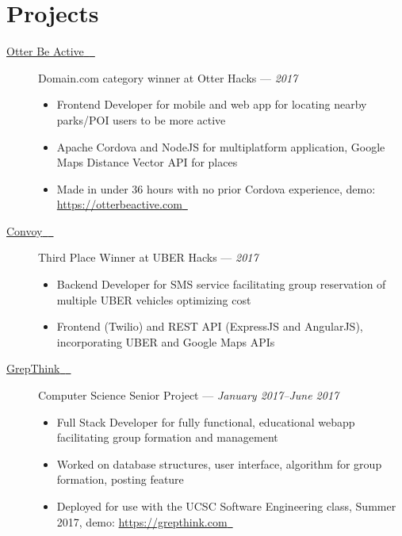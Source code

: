 \documentclass[10pt]{article}
\let\orighref\href
\renewcommand{\href}[2]{\orighref{#1}{#2{\scriptsize~\color{darkgray}\faExternalLink}}}
\renewcommand{\url}[1]{\href{#1}{#1}}
\begin{document}
\section*{Projects}
\begin{description}
  \item[\href{https://github.com/4U6U57/otterhacks17.otterbeactive}{Otter Be
    Active}] Domain.com category winner at Otter Hacks --- \textit{2017}
    \begin{itemize}
      \item Frontend Developer for mobile and web app for locating nearby
        parks/POI
        users to be more active
      \item Apache Cordova and NodeJS for multiplatform application, Google Maps
        Distance Vector API for places
      \item Made in under 36 hours with no prior Cordova experience, demo:
        \url{https://otterbeactive.com}
    \end{itemize}
  \item[\href{https://github.com/4U6U57/uberhacks17.convoy}{Convoy}] Third
    Place Winner at UBER Hacks --- \textit{2017}
    \begin{itemize}
      \item Backend Developer for SMS service facilitating group reservation of
        multiple UBER vehicles optimizing cost
      \item Frontend (Twilio) and REST API (ExpressJS and AngularJS),
        incorporating UBER and Google Maps APIs
    \end{itemize}
  \item[\href{https://github.com/grepthink/grepthink}{GrepThink}] Computer
    Science Senior Project --- \textit{January 2017--June 2017}
    \begin{itemize}
      \item Full Stack Developer for fully functional, educational webapp
        facilitating group formation and management
      \item Worked on database structures, user interface, algorithm for group
        formation, posting feature
      \item Deployed for use with the UCSC Software Engineering class, Summer
        2017, demo: \url{https://grepthink.com}
    \end{itemize}
\end{description}
\end{document}
